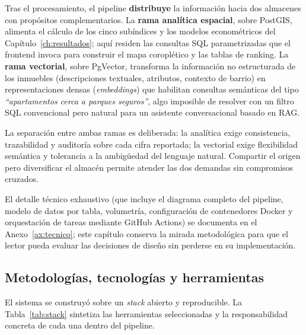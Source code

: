 \documentclass[12pt, a4paper, twoside, openright]{report}
\theoremstyle{plain}
\theoremstyle{definition}
\begin{document}
Tras el procesamiento, el pipeline \textbf{distribuye} la información hacia dos almacenes con propósitos complementarios. La \textbf{rama analítica espacial}, sobre PostGIS, alimenta el cálculo de los cinco subíndices y los modelos econométricos del Capítulo~\ref{ch:resultados}; aquí residen las consultas SQL parametrizadas que el frontend invoca para construir el mapa coroplético y las tablas de ranking. La \textbf{rama vectorial}, sobre PgVector, transforma la información no estructurada de los inmuebles (descripciones textuales, atributos, contexto de barrio) en representaciones densas (\emph{embeddings}) que habilitan consultas semánticas del tipo \emph{``apartamentos cerca a parques seguros''}, algo imposible de resolver con un filtro SQL convencional pero natural para un asistente conversacional basado en RAG.

La separación entre ambas ramas es deliberada: la analítica exige consistencia, trazabilidad y auditoría sobre cada cifra reportada; la vectorial exige flexibilidad semántica y tolerancia a la ambigüedad del lenguaje natural. Compartir el origen pero diversificar el almacén permite atender las dos demandas sin compromisos cruzados.

El detalle técnico exhaustivo (que incluye el diagrama completo del pipeline, modelo de datos por tabla, volumetría, configuración de contenedores Docker y orquestación de tareas mediante GitHub Actions) se documenta en el Anexo~\ref{ax:tecnico}; este capítulo conserva la mirada metodológica para que el lector pueda evaluar las decisiones de diseño sin perderse en su implementación.

\subsection{Metodologías, tecnologías y herramientas}
\label{subsec:stack}

El sistema se construyó sobre un \emph{stack} abierto y reproducible. La Tabla~\ref{tab:stack} sintetiza las herramientas seleccionadas y la responsabilidad concreta de cada una dentro del pipeline.
\end{document}
